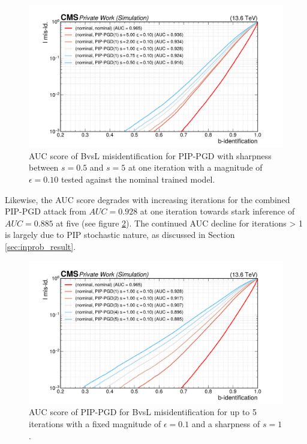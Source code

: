 \begin{figure}[h]
\centering
    \includegraphics[width=15cm]{media/output/roc_bvsl_combined_sharpness.pdf}
    \caption{AUC score of BvsL misidentification for PIP-PGD with sharpness between $s=0.5$ and $s=5$ at one iteration with a magnitude of $\epsilon=0.10$ tested against the nominal trained model.}
    \label{fig:combined_testing_sharpness}
\end{figure}

Likewise, the AUC score degrades with increasing iterations for the combined PIP-PGD attack from $AUC=0.928$ at one iteration towards stark inference of $AUC=0.885$ at five (see figure \ref{fig:combined_testing_iterations}). The continued AUC decline for iterations > 1 is largely due to PIP stochastic nature, as discussed in Section \ref{sec:inprob_result}.

\begin{figure}[h]
\centering
    \includegraphics[width=15cm]{media/output/roc_bvsl_combined_iterations.pdf}
    \caption{AUC score of PIP-PGD for BvsL misidentification for up to 5 iterations with a fixed magnitude of $\epsilon=0.1$ and a sharpness of $s=1$.}
    \label{fig:combined_testing_iterations}
\end{figure}


